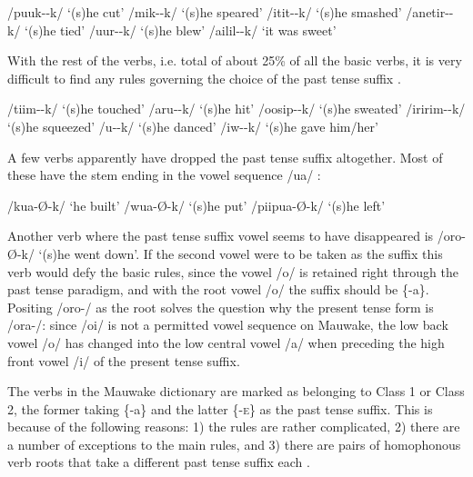 \ea
\label{ex:2:rule4ex}
\ea
/puuk--k/  `(s)he cut'
\ex
/mik--k/  `(s)he speared'
\ex
/itit--k/  `(s)he smashed'
\ex
/anetir--k/  `(s)he tied'
\ex
/{\textphi}uur--k/  `(s)he blew'
\ex
/a{\textphi}ilil--k/  `it was sweet'
\z
\z

With the rest of the verbs, i.e. total of about 25\% of all the basic verbs, it is very difficult to find any rules governing the choice of the past tense suffix .

\ea
\label{ex:2:norule}
\ea
/tiim--k/  `(s)he touched'
\ex
/aru{\textphi}--k/  `(s)he hit'
\ex
/oosip--k/   `(s)he sweated'
\ex
/{\textphi}iririm--k/  `(s)he squeezed'
\ex
/u{\textphi}--k/  `(s)he danced'
\ex
/iw--k/  `(s)he gave him/her'
\z
\z

A few verbs apparently have dropped the past tense suffix altogether.  Most of these have the stem ending in the vowel sequence /ua/ :

\ea
\label{ex:2:nopasttensesuffix}
\ea
/kua-{\O-k}/  `he built'
\ex
/wua-{\O-k}/  `(s)he put'
\ex
/piipua-{\O-k}/  `(s)he left'
\z
\z

Another verb where the past tense suffix vowel seems to have disappeared is /oro-{\O}-k/ `(s)he went down'.  If the second vowel were to be taken as the suffix this verb would defy the basic rules, since the vowel /o/ is retained right through the past tense paradigm, and with the root vowel /o/ the suffix should be \{-a\}.  Positing /oro-/ as the root solves the question why the present tense form is /ora-/: since /oi/ is not a permitted vowel sequence on Mauwake, the low back vowel /o/ has changed into the low central vowel /a/ when preceding the high front vowel /i/ of the present tense suffix.

The verbs in the Mauwake dictionary are marked as belonging to Class 1 or Class 2, the former taking \{-a\} and the latter \{-\textsc{e}\} as the past tense suffix. This is because of the following reasons: 1) the rules are rather complicated, 2) there are a number of exceptions to the main rules, and 3) there are pairs of homophonous verb roots that take a different past tense suffix each .

